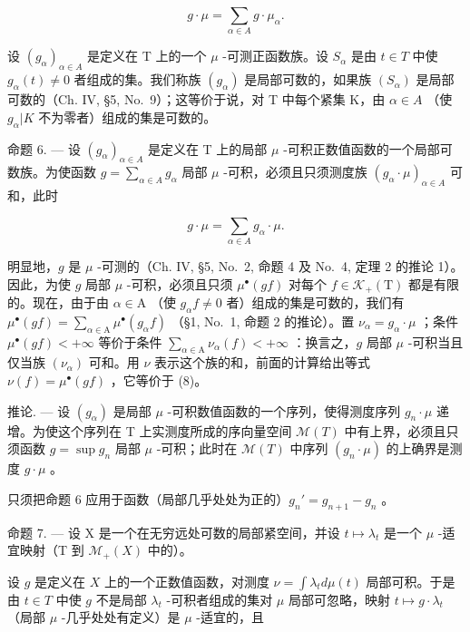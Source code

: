\[
g \cdot \mu = \sum_ {\alpha \in A} g \cdot \mu_ {\alpha}.\tag{7}
\]

设 \((g_{\alpha})_{\alpha \in A}\) 是定义在 T 上的一个 \(\mu\) -可测正函数族。设 \(S_{\alpha}\) 是由 \(t \in T\) 中使 \(g_{\alpha}(t) \neq 0\) 者组成的集。我们称族 \((g_{\alpha})\) 是局部可数的，如果族 \((S_{\alpha})\) 是局部可数的（Ch. IV, §5, No.~9）；这等价于说，对 T 中每个紧集 K，由 \(\alpha \in A\) （使 \(g_{\alpha}|K\) 不为零者）组成的集是可数的。

命题 6. --- 设 \((g_{\alpha})_{\alpha \in A}\) 是定义在 T 上的局部 \(\mu\) -可积正数值函数的一个局部可数族。为使函数 \(g = \sum_{\alpha \in A} g_{\alpha}\) 局部 \(\mu\) -可积，必须且只须测度族 \((g_{\alpha} \cdot \mu)_{\alpha \in A}\) 可和，此时

\[
g \cdot \mu = \sum_ {\alpha \in A} g _ {\alpha} \cdot \mu .\tag{8}
\]

明显地，\(g\) 是 \(\mu\) -可测的（Ch. IV, §5, No.~2, 命题 4 及 No.~4, 定理 2 的推论 1）。因此，为使 \(g\) 局部 \(\mu\) -可积，必须且只须 \(\mu^{\bullet}(gf)\) 对每个 \(f \in \mathcal{K}_{+}(\mathrm{T})\) 都是有限的。现在，由于由 \(\alpha \in \mathrm{A}\) （使 \(g_{\alpha}f \neq 0\) 者）组成的集是可数的，我们有 \(\mu^{\bullet}(gf) = \sum_{\alpha \in \mathrm{A}} \mu^{\bullet}(g_{\alpha}f)\) （§1, No.~1, 命题 2 的推论）。置 \(\nu_{\alpha} = g_{\alpha} \cdot \mu\) ；条件 \(\mu^{\bullet}(gf) < +\infty\) 等价于条件 \(\sum_{\alpha \in \mathrm{A}} \nu_{\alpha}(f) < +\infty\) ：换言之，\(g\) 局部 \(\mu\) -可积当且仅当族 \((\nu_{\alpha})\) 可和。用 \(\nu\) 表示这个族的和，前面的计算给出等式 \(\nu(f) = \mu^{\bullet}(gf)\) ，它等价于 (8)。

推论. --- 设 \((g_{\alpha})\) 是局部 \(\mu\) -可积数值函数的一个序列，使得测度序列 \(g_{n} \cdot \mu\) 递增。为使这个序列在 T 上实测度所成的序向量空间 \(\mathcal{M}(T)\) 中有上界，必须且只须函数 \(g = \sup g_{n}\) 局部 \(\mu\) -可积；此时在 \(\mathcal{M}(T)\) 中序列 \((g_{n} \cdot \mu)\) 的上确界是测度 \(g \cdot \mu\) 。

只须把命题 6 应用于函数（局部几乎处处为正的）\(g_n' = g_{n+1} - g_n\) 。

命题 7. --- 设 X 是一个在无穷远处可数的局部紧空间，并设 \(t \mapsto \lambda_t\) 是一个 \(\mu\) -适宜映射（T 到 \(\mathcal{M}_+(X)\) 中的）。

设 \(g\) 是定义在 \(X\) 上的一个正数值函数，对测度 \(\nu = \int \lambda_t d\mu(t)\) 局部可积。于是由 \(t \in T\) 中使 \(g\) 不是局部 \(\lambda_t\) -可积者组成的集对 \(\mu\) 局部可忽略，映射 \(t \mapsto g \cdot \lambda_t\) （局部 \(\mu\) -几乎处处有定义）是 \(\mu\) -适宜的，且


